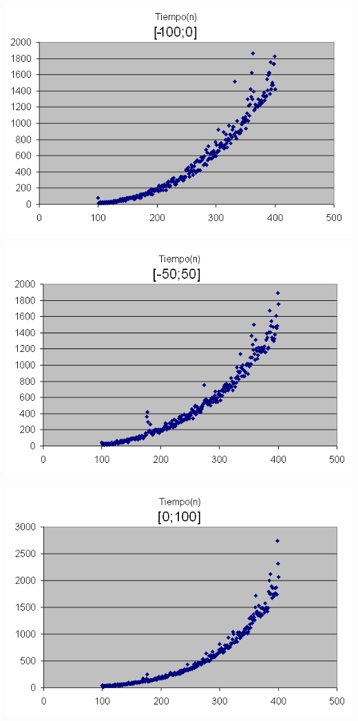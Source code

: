\begin{center}
	\includegraphics[scale=0.6]{images/ej1_1.png}
\end{center}

\begin{center}
	\includegraphics[scale=0.6]{images/ej1_2.png}
\end{center}

\begin{center}
	\includegraphics[scale=0.6]{images/ej1_3.png}
\end{center}


